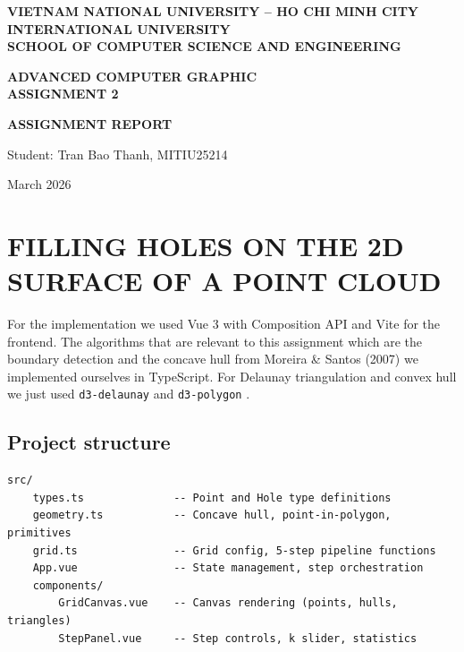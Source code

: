 \documentclass[12pt]{extreport}
\begin{document}
\begin{titlepage}
    \centering
    \vspace*{1cm}
    \textbf{VIETNAM NATIONAL UNIVERSITY -- HO CHI MINH CITY}\\
    \textbf{INTERNATIONAL UNIVERSITY}\\
    \textbf{SCHOOL OF COMPUTER SCIENCE AND ENGINEERING}

    \vspace{3cm}
    \textbf{ADVANCED COMPUTER GRAPHIC}\\
    \textbf{ASSIGNMENT 2}

    \vspace{4cm}
    \textbf{ASSIGNMENT REPORT}

    \vspace{3cm}
    \begin{flushleft}
    \hspace{4cm} Student: Tran Bao Thanh, MITIU25214 \\
    \end{flushleft}

    \vfill
    March 2026
\end{titlepage}

\setcounter{page}{2}
\tableofcontents
\newpage

\chapter{FILLING HOLES ON THE 2D SURFACE OF A POINT CLOUD}

For the implementation we used Vue 3 with Composition API and Vite for the frontend. The algorithms that are relevant to this assignment which are the boundary detection and the concave hull from Moreira \& Santos (2007) we implemented ourselves in TypeScript. For Delaunay triangulation and convex hull we just used \texttt{d3-delaunay} and \texttt{d3-polygon} .

\section{Project structure}

\begin{verbatim}
src/
    types.ts              -- Point and Hole type definitions
    geometry.ts           -- Concave hull, point-in-polygon, primitives
    grid.ts               -- Grid config, 5-step pipeline functions
    App.vue               -- State management, step orchestration
    components/
        GridCanvas.vue    -- Canvas rendering (points, hulls, triangles)
        StepPanel.vue     -- Step controls, k slider, statistics
\end{verbatim}
\end{document}
